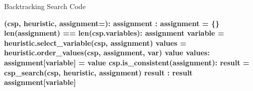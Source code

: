\documentclass[14pt]{beamer}
\begin{document}
\begin{frame}[fragile]{Backtracking Search Code}
	\scriptsize
	\begin{semiverbatim}\bfseries
		 (csp, heuristic, assignment=):
		    \pause{} assignment  :
		        assignment = \{\}
		    \pause{}
		     len(assignment) == len(csp.variables):
		         assignment
		    \pause{}
		    variable = heuristic.select_variable(csp, assignment)
		    values = heuristic.order_values(csp, assignment, var)
		    \pause{}
		     value  values:
		        assignment[variable] = value
		        \pause{}
		         csp.is_consistent(assignment):
		            result = csp_search(csp, heuristic, assignment)
		             result   :
		                 result
		        \pause{} assignment[variable]
		     
	\end{semiverbatim}
\end{frame}
\end{document}
